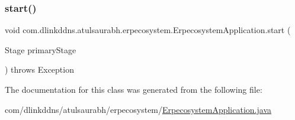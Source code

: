 \mbox{\label{classcom_1_1dlinkddns_1_1atulsaurabh_1_1erpecosystem_1_1_erpecosystem_application_a90a76d5aca54f84a9873a8121d3d0fad}} 
\subsubsection{\texorpdfstring{start()}{start()}}
{\footnotesize\ttfamily void com.\+dlinkddns.\+atulsaurabh.\+erpecosystem.\+Erpecosystem\+Application.\+start (\begin{DoxyParamCaption}\item[{Stage}]{primary\+Stage }\end{DoxyParamCaption}) throws Exception}



The documentation for this class was generated from the following file\+:\begin{DoxyCompactItemize}
\item 
com/dlinkddns/atulsaurabh/erpecosystem/\mbox{\hyperlink{_erpecosystem_application_8java}{Erpecosystem\+Application.\+java}}\end{DoxyCompactItemize}
